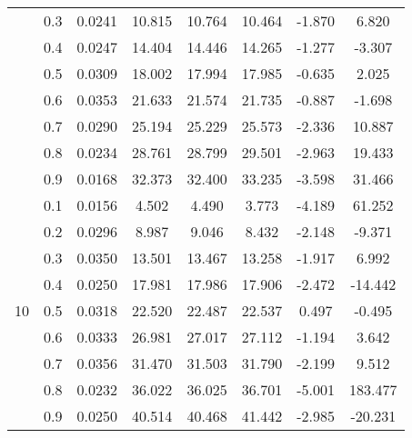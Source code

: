 \documentclass[11pt,a4paper]{report}
\begin{document}
\begin{longtable}{ | c | c || c | c | c | c | c | c | }
 & 0.3 & 0.0241 & 10.815 & 10.764 & 10.464 & -1.870 & 6.820 \\
 & 0.4 & 0.0247 & 14.404 & 14.446 & 14.265 & -1.277 & -3.307 \\
 & 0.5 & 0.0309 & 18.002 & 17.994 & 17.985 & -0.635 & 2.025 \\
 & 0.6 & 0.0353 & 21.633 & 21.574 & 21.735 & -0.887 & -1.698 \\
 & 0.7 & 0.0290 & 25.194 & 25.229 & 25.573 & -2.336 & 10.887 \\
 & 0.8 & 0.0234 & 28.761 & 28.799 & 29.501 & -2.963 & 19.433 \\
 & 0.9 & 0.0168 & 32.373 & 32.400 & 33.235 & -3.598 & 31.466 \\
 \hline
\multirow{9}{*}{10} & 0.1 & 0.0156 & 4.502 & 4.490 & 3.773 & -4.189 & 61.252 \\
 & 0.2 & 0.0296 & 8.987 & 9.046 & 8.432 & -2.148 & -9.371 \\
 & 0.3 & 0.0350 & 13.501 & 13.467 & 13.258 & -1.917 & 6.992 \\
 & 0.4 & 0.0250 & 17.981 & 17.986 & 17.906 & -2.472 & -14.442 \\
 & 0.5 & 0.0318 & 22.520 & 22.487 & 22.537 & 0.497 & -0.495 \\
 & 0.6 & 0.0333 & 26.981 & 27.017 & 27.112 & -1.194 & 3.642 \\
 & 0.7 & 0.0356 & 31.470 & 31.503 & 31.790 & -2.199 & 9.512 \\
 & 0.8 & 0.0232 & 36.022 & 36.025 & 36.701 & -5.001 & 183.477 \\
 & 0.9 & 0.0250 & 40.514 & 40.468 & 41.442 & -2.985 & -20.231 \\
 \hline
\hline
\end{longtable}
\end{document}
